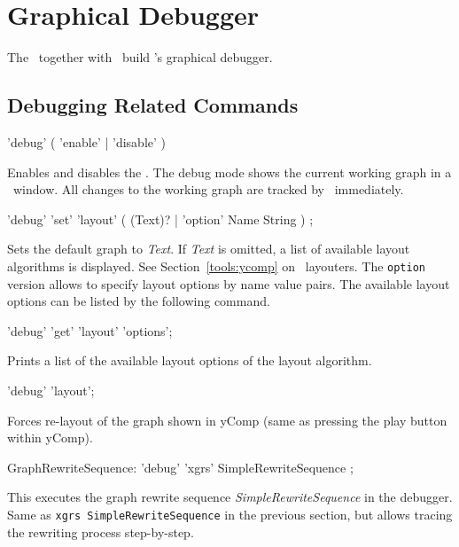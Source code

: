 

\section{Graphical Debugger}
\label{sct:debugger}
The \GrShell\ together with \yComp\ build \GrG's graphical debugger.

\subsection{Debugging Related Commands}

\begin{rail}
  'debug' ( 'enable' | 'disable' )
\end{rail}
Enables and disables the .
The debug mode shows the current working graph in a \yComp\ window.
All changes to the working graph are tracked by \yComp\ immediately.  

\begin{rail}
  'debug' 'set' 'layout' ( (Text)? | 'option' Name String ) ;
\end{rail}
Sets the default graph  to \emph{Text}.
If \emph{Text} is omitted, a list of available layout algorithms is displayed.
See Section~\ref{tools:ycomp} on \yComp\ layouters.
The \texttt{option} version allows to specify layout options by name value pairs.
The available layout options can be listed by the following command.

\begin{rail}
  'debug' 'get' 'layout' 'options';
\end{rail}
Prints a list of the available layout options of the layout algorithm.

\begin{rail}
  'debug' 'layout';
\end{rail}
Forces re-layout of the graph shown in yComp (same as pressing the play button within yComp).

\begin{rail}
  GraphRewriteSequence: 'debug' 'xgrs' SimpleRewriteSequence ;
\end{rail}
This executes the graph rewrite sequence \emph{SimpleRewriteSequence} in the debugger.
Same as \texttt{xgrs SimpleRewriteSequence} in the previous section, but allows tracing the rewriting process step-by-step. 


